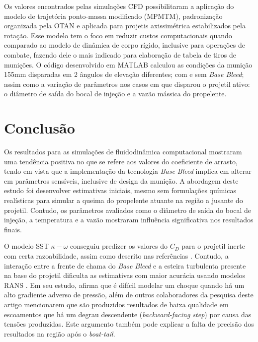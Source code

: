 Os valores encontrados pelas simulações CFD possibilitaram a aplicação do modelo de trajetória ponto-massa modificado (MPMTM), padronização organizada pela OTAN \cite{stanag4355} e aplicada para projetis axissimétrica estabilizados pela rotação. Esse modelo tem o foco em reduzir custos computacionais quando comparado ao modelo de dinâmica de corpo rígido, inclusive para operações de combate, fazendo dele o mais indicado para elaboração de tabela de tiros de munições. O código desenvolvido em MATLAB\textregistered{} \cite{ThallyoENCIT2022,Thallyo2022} calculou as condições da munição 155mm disparadas em 2 ângulos de elevação diferentes; com e sem \textit{Base Bleed}; assim como a variação de parâmetros nos casos em que disparou o projetil ativo: o diâmetro de saída do bocal de injeção e a vazão mássica do propelente. 

\section{Conclusão}

Os resultados para as simulações de fluidodinâmica computacional mostraram uma tendência positiva no que se refere aos valores do coeficiente de arrasto, tendo em vista que a implementação da tecnologia \textit{Base Bleed} implica em alterar em parâmetros sensíveis, inclusive de design da munição. A abordagem deste estudo foi desenvolver estimativas iniciais, mesmo sem formulações químicas realísticas para simular a queima do propelente atuante na região a jusante do projetil. Contudo, os parâmetros avaliados como o diâmetro de saída do bocal de injeção, a temperatura e a vazão mostraram influência significativa nos resultados finais.

O modelo SST $\kappa-\omega$ conseguiu predizer os valores do $C_D$ para o projetil inerte com certa razoabilidade, assim como descrito nas referências \cite{Mahmoud2009,nicolas-perez_accuracy_2017}. Contudo, a interação entre a frente de chama do \textit{Base Bleed} e a esteira turbulenta presente na base do projetil dificulta as estimativas com maior acurácia usando modelos RANS \cite{nicolas-perez_accuracy_2017}. Em seu estudo, \citeauthor{Spalart1992} afirma que é difícil modelar um choque quando há um alto gradiente adverso de pressão, além de outros colaboradores da pesquisa deste artigo mencionarem que são produzidos resultados de baixa qualidade em escoamentos que há um degrau descendente (\textit{backward-facing step}) por causa das tensões produzidas. Este argumento também pode explicar a falta de precisão dos resultados na região após o \textit{boat-tail}.

